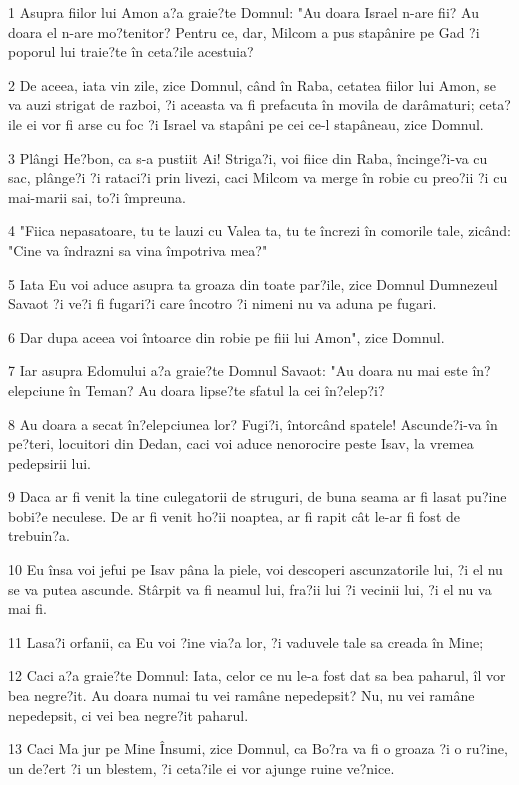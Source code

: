\par 1 Asupra fiilor lui Amon a?a graie?te Domnul: "Au doara Israel n-are fii? Au doara el n-are mo?tenitor? Pentru ce, dar, Milcom a pus stapânire pe Gad ?i poporul lui traie?te în ceta?ile acestuia?
\par 2 De aceea, iata vin zile, zice Domnul, când în Raba, cetatea fiilor lui Amon, se va auzi strigat de razboi, ?i aceasta va fi prefacuta în movila de darâmaturi; ceta?ile ei vor fi arse cu foc ?i Israel va stapâni pe cei ce-l stapâneau, zice Domnul.
\par 3 Plângi He?bon, ca s-a pustiit Ai! Striga?i, voi fiice din Raba, încinge?i-va cu sac, plânge?i ?i rataci?i prin livezi, caci Milcom va merge în robie cu preo?ii ?i cu mai-marii sai, to?i împreuna.
\par 4 "Fiica nepasatoare, tu te lauzi cu Valea ta, tu te încrezi în comorile tale, zicând: "Cine va îndrazni sa vina împotriva mea?"
\par 5 Iata Eu voi aduce asupra ta groaza din toate par?ile, zice Domnul Dumnezeul Savaot ?i ve?i fi fugari?i care încotro ?i nimeni nu va aduna pe fugari.
\par 6 Dar dupa aceea voi întoarce din robie pe fiii lui Amon", zice Domnul.
\par 7 Iar asupra Edomului a?a graie?te Domnul Savaot: "Au doara nu mai este în?elepciune în Teman? Au doara lipse?te sfatul la cei în?elep?i?
\par 8 Au doara a secat în?elepciunea lor? Fugi?i, întorcând spatele! Ascunde?i-va în pe?teri, locuitori din Dedan, caci voi aduce nenorocire peste Isav, la vremea pedepsirii lui.
\par 9 Daca ar fi venit la tine culegatorii de struguri, de buna seama ar fi lasat pu?ine bobi?e neculese. De ar fi venit ho?ii noaptea, ar fi rapit cât le-ar fi fost de trebuin?a.
\par 10 Eu însa voi jefui pe Isav pâna la piele, voi descoperi ascunzatorile lui, ?i el nu se va putea ascunde. Stârpit va fi neamul lui, fra?ii lui ?i vecinii lui, ?i el nu va mai fi.
\par 11 Lasa?i orfanii, ca Eu voi ?ine via?a lor, ?i vaduvele tale sa creada în Mine;
\par 12 Caci a?a graie?te Domnul: Iata, celor ce nu le-a fost dat sa bea paharul, îl vor bea negre?it. Au doara numai tu vei ramâne nepedepsit? Nu, nu vei ramâne nepedepsit, ci vei bea negre?it paharul.
\par 13 Caci Ma jur pe Mine Însumi, zice Domnul, ca Bo?ra va fi o groaza ?i o ru?ine, un de?ert ?i un blestem, ?i ceta?ile ei vor ajunge ruine ve?nice.
